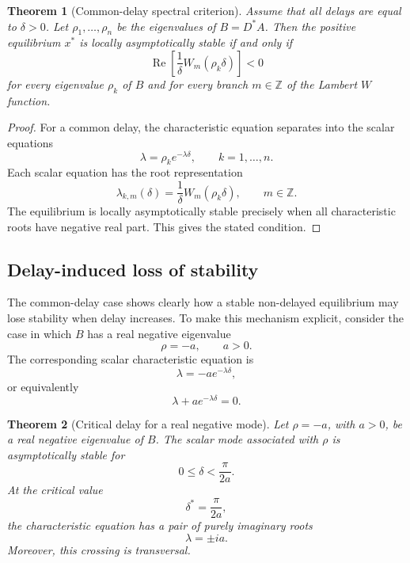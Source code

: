 \documentclass[11pt]{article}
\newtheorem{theorem}{Theorem}
\begin{document}
 \begin{theorem}[Common-delay spectral criterion]
 	\label{thm:common-delay-spectral}
 	Assume that all delays are equal to $\delta>0$. Let
 	$\rho_1,\ldots,\rho_n$ be the eigenvalues of $B=D^\ast A$. Then the positive
 	equilibrium $x^\ast$ is locally asymptotically stable if and only if
 	\[
 	\operatorname{Re}
 	\left[
 	\frac{1}{\delta}W_m(\rho_k\delta)
 	\right]<0
 	\]
 	for every eigenvalue $\rho_k$ of $B$ and for every branch
 	$m\in\mathbb{Z}$ of the Lambert $W$ function.
 \end{theorem}
 
 \begin{proof}
 	For a common delay, the characteristic equation separates into the scalar
 	equations
 	\[
 	\lambda=\rho_k e^{-\lambda\delta},
 	\qquad k=1,\ldots,n.
 	\]
 	Each scalar equation has the root representation
 	\[
 	\lambda_{k,m}(\delta)
 	=
 	\frac{1}{\delta}W_m(\rho_k\delta),
 	\qquad m\in\mathbb{Z}.
 	\]
 	The equilibrium is locally asymptotically stable precisely when all
 	characteristic roots have negative real part. This gives the stated condition.
 \end{proof}
 
 
 
 
 \subsection{Delay-induced loss of stability}
 
 The common-delay case shows clearly how a stable non-delayed equilibrium may
 lose stability when delay increases. To make this mechanism explicit, consider
 the case in which $B$ has a real negative eigenvalue
 \[
 \rho=-a,
 \qquad a>0.
 \]
 The corresponding scalar characteristic equation is
 \[
 \lambda=-a e^{-\lambda\delta},
 \]
 or equivalently
 \begin{equation}
 \label{eq:scalar-negative-characteristic}
 \lambda+a e^{-\lambda\delta}=0.
 \end{equation}
 
 \begin{theorem}[Critical delay for a real negative mode]
 	\label{thm:critical-delay-real-negative}
 	Let $\rho=-a$, with $a>0$, be a real negative eigenvalue of $B$. The scalar
 	mode associated with $\rho$ is asymptotically stable for
 	\[
 	0\leq \delta<\frac{\pi}{2a}.
 	\]
 	At the critical value
 	\[
 	\delta^\ast=\frac{\pi}{2a},
 	\]
 	the characteristic equation has a pair of purely imaginary roots
 	\[
 	\lambda=\pm ia.
 	\]
 	Moreover, this crossing is transversal.
 \end{theorem}
 
\end{document}
